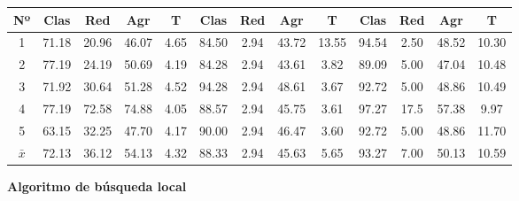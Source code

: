 \documentclass[12pt]{article}
\begin{document}
\begin{table}[h]
\begin{tabular}{ccccc|cccc|cccc}
\textbf{Nº} & \textbf{Clas} & \textbf{Red} & \textbf{Agr} & \textbf{T} & \textbf{Clas} & \textbf{Red} & \textbf{Agr} & \textbf{T} & \textbf{Clas} & \textbf{Red} & \textbf{Agr} & \textbf{T} \\ \hline
1           & 71.18         & 20.96        & 46.07        & 4.65      & 84.50         & 2.94        & 43.72        & 13.55      & 94.54         & 2.50           & 48.52        & 10.30      \\
2           & 77.19         & 24.19         & 50.69        & 4.19      & 84.28         & 2.94        & 43.61        & 3.82      & 89.09         & 5.00          & 47.04        & 10.48      \\
3           & 71.92        & 30.64         & 51.28        & 4.52      & 94.28         & 2.94        & 48.61        & 3.67      & 92.72         & 5.00          & 48.86        & 10.49      \\
4           & 77.19         & 72.58         & 74.88        & 4.05      & 88.57         & 2.94        & 45.75        & 3.61      & 97.27         & 17.5          & 57.38        & 9.97     \\
5           & 63.15            & 32.25         & 47.70        & 4.17      & 90.00         & 2.94        & 46.47        & 3.60      & 92.72         & 5.00            & 48.86        & 11.70      \\ \hline
$\bar{x}$           & 72.13         & 36.12         & 54.13        & 4.32      & 88.33         & 2.94        & 45.63        & 5.65      & 93.27         & 7.00          & 50.13        & 10.59
\end{tabular}
\end{table}

\textbf{Algoritmo de búsqueda local}
\end{document}
